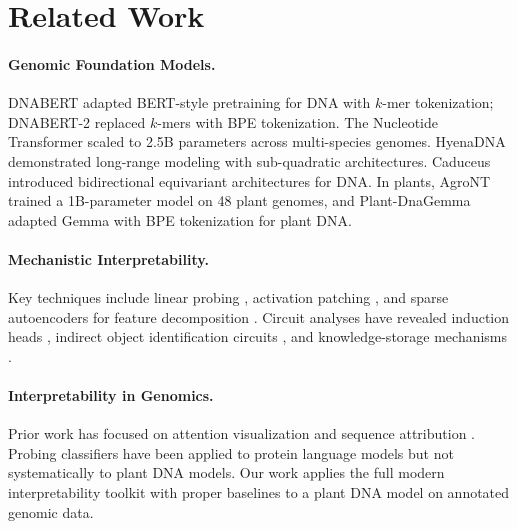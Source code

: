 \documentclass{article}
\begin{document}
\section{Related Work}

\paragraph{Genomic Foundation Models.}
DNABERT \citep{ji2021dnabert} adapted BERT-style pretraining for DNA with
$k$-mer tokenization; DNABERT-2 \citep{zhou2023dnabert2} replaced $k$-mers
with BPE tokenization. The Nucleotide Transformer \citep{dalla2023nucleotide}
scaled to 2.5B parameters across multi-species genomes. HyenaDNA
\citep{nguyen2024hyenadna} demonstrated long-range modeling with sub-quadratic
architectures. Caduceus \citep{schiff2024caduceus} introduced bidirectional
equivariant architectures for DNA. In plants, AgroNT
\citep{mendoza2024agront} trained a 1B-parameter model on 48 plant genomes,
and Plant-DnaGemma \citep{zhang2024plantdnagemma} adapted Gemma with BPE
tokenization for plant DNA.

\paragraph{Mechanistic Interpretability.}
Key techniques include linear probing \citep{alain2017understanding,
belinkov2017neural, hewitt2019structural}, activation patching
\citep{vig2020investigating, meng2022locating}, and sparse autoencoders for
feature decomposition \citep{cunningham2023sparse, bricken2023monosemanticity,
templeton2024scaling, gao2024scaling}. Circuit analyses have revealed
induction heads \citep{olsson2022context}, indirect object identification
circuits \citep{wang2023interpretability}, and knowledge-storage mechanisms
\citep{geva2023dissecting}.

\paragraph{Interpretability in Genomics.}
Prior work has focused on attention visualization
\citep{clauwaert2021explainability} and sequence attribution
\citep{avsec2021effective}. Probing classifiers have been applied to protein
language models \citep{vig2021bertology, rao2019evaluating, rives2021biological}
but not systematically to plant DNA models. Our work applies the full modern
interpretability toolkit with proper baselines to a plant DNA model on
annotated genomic data.
\end{document}
